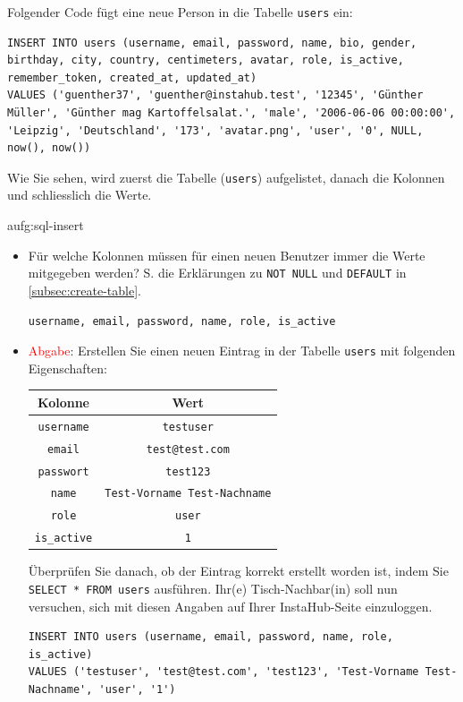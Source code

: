 \begin{myexample}\label{ex:sql-insert}
Folgender Code fügt eine neue Person in die Tabelle \texttt{users} ein:
\begin{lstlisting}[style=sql]
INSERT INTO users (username, email, password, name, bio, gender, birthday, city, country, centimeters, avatar, role, is_active, remember_token, created_at, updated_at) 
VALUES ('guenther37', 'guenther@instahub.test', '12345', 'Günther Müller', 'Günther mag Kartoffelsalat.', 'male', '2006-06-06 00:00:00', 'Leipzig', 'Deutschland', '173', 'avatar.png', 'user', '0', NULL, now(), now())
\end{lstlisting}
Wie Sie sehen, wird zuerst die Tabelle (\texttt{users}) aufgelistet, danach die Kolonnen und schliesslich die Werte.
\end{myexample}

\begin{aufgabe}{aufg:sql-insert}
\begin{itemize}
\item Für welche Kolonnen müssen für einen neuen Benutzer immer die Werte mitgegeben werden? S. die Erklärungen zu \lstinline[style=sql]|NOT NULL| und \lstinline[style=sql]|DEFAULT| in \cref{subsec:create-table}.
\begin{myantwort}
\begin{verbatim}
username, email, password, name, role, is_active
\end{verbatim}
\end{myantwort}
\item \textcolor{red}{Abgabe}: Erstellen Sie einen neuen Eintrag in der Tabelle \texttt{users} mit folgenden Eigenschaften:
\begin{table}[H]
\centering
\begin{tabular}{c|c}
\textbf{Kolonne} & \textbf{Wert} \\\midrule
\texttt{username} & \texttt{testuser}\\
\texttt{email} & \texttt{test@test.com} \\
\texttt{passwort}& \texttt{test123}\\
\texttt{name}& \texttt{Test-Vorname Test-Nachname}\\
\texttt{role} & \texttt{user}\\
\texttt{is\_active} & \texttt{1}\\
\end{tabular}
\end{table}
Überprüfen Sie danach, ob der Eintrag korrekt erstellt worden ist, indem Sie  \lstinline[style=sql]|SELECT * FROM users| ausführen.
Ihr(e) Tisch-Nachbar(in) soll nun versuchen, sich mit diesen Angaben auf Ihrer InstaHub-Seite einzuloggen.
\begin{myantwort}
\begin{lstlisting}[style=sql]
INSERT INTO users (username, email, password, name, role, is_active) 
VALUES ('testuser', 'test@test.com', 'test123', 'Test-Vorname Test-Nachname', 'user', '1')
\end{lstlisting}
\end{myantwort}
\end{itemize}
\end{aufgabe}

